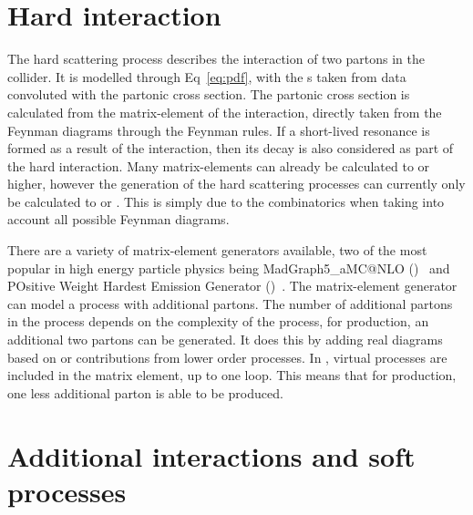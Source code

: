 \section{Hard interaction} %
\label{sec:hard_interaction}
The hard scattering process describes the interaction of two partons in the collider.
It is modelled through Eq~\ref{eq:pdf}, with the \PDF{}s taken from data convoluted with the partonic cross section.
The partonic cross section is calculated from the matrix-element of the interaction, directly taken from the Feynman diagrams through the Feynman rules.
If a short-lived resonance is formed as a result of the interaction, then its decay is also considered as part of the hard interaction.
Many matrix-elements can already be calculated to \NNLO{} or higher, however the generation of the hard scattering processes can currently only be calculated to \LO{} or \NLO{}.
This is simply due to the combinatorics when taking into account all possible Feynman diagrams.

There are a variety of matrix-element generators available, two of the most popular in high energy particle physics being MadGraph5\_aMC@NLO (\mgamc{})~\cite{Gen:MGamc} and POsitive Weight Hardest Emission Generator (\powheg{})~\cite{Gen:Pow1,Gen:Pow2,Gen:Pow3}.
The \mgamc{} matrix-element generator can model a process with additional partons.
The number of additional partons in the process depends on the complexity of the process, \eg{} for \NLO{} \ttbar{} production, an additional two partons can be generated.
It does this by adding real diagrams based on \LO{} or \NLO{} contributions from lower order processes.
In \powheg{}, virtual processes are included in the matrix element, up to one loop. 
This means that for \ttbar{} production, one less additional parton is able to be produced.



\section{Additional interactions and soft processes} %
\label{sec:additional_interactions_and_soft_processes}

